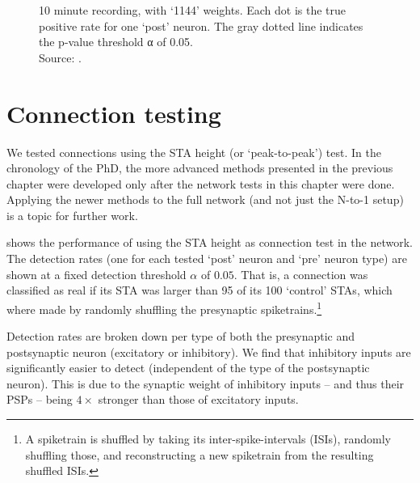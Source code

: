\begin{figure}
    {10 minute recording, with `1144' weights. Each dot is the true positive rate for one `post' neuron. The gray dotted line indicates the p-value threshold α of 0.05.\\
    Source: .}
    \label{fig:net-perf}
    \vspace*{2em}
\end{figure}



\section{Connection testing}

We tested connections using the STA height (or `peak-to-peak') test. In the chronology of the PhD, the more advanced methods presented in the previous chapter were developed only after the network tests in this chapter were done. Applying the newer methods to the full network (and not just the N-to-1 setup) is a topic for further work.

 shows the performance of using the STA height as connection test in the network. The detection rates (one for each tested `post' neuron and `pre' neuron type) are shown at a fixed detection threshold $α$ of $0.05$. That is, a connection was classified as real if its STA was larger than 95 of its 100 `control' STAs, which where made by randomly shuffling the presynaptic spiketrains.\footnote{
    A spiketrain is shuffled by taking its inter-spike-intervals (ISIs), randomly shuffling those, and reconstructing a new spiketrain from the resulting shuffled ISIs.
}

Detection rates are broken down per type of both the presynaptic and postsynaptic neuron (excitatory or inhibitory). We find that inhibitory inputs are significantly easier to detect (independent of the type of the postsynaptic neuron). This is due to the synaptic weight of inhibitory inputs -- and thus their PSPs -- being $4×$ stronger than those of excitatory inputs.


